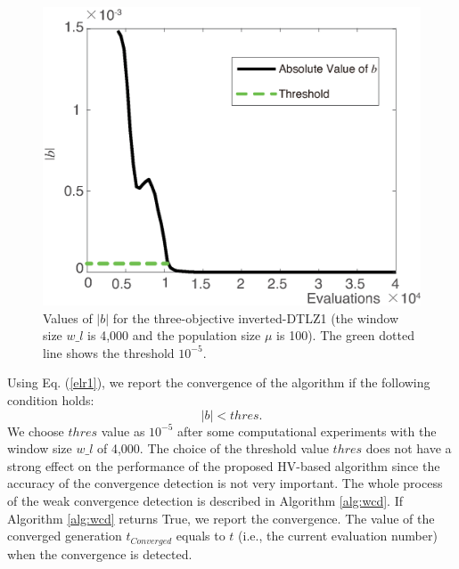 \documentclass[conference]{IEEEtran}
\begin{document}
\begin{figure}[!t]
  \centering
    \includegraphics[width=\columnwidth]{FVEMOA_IDTLZ1_M3_nadir_2}
  \caption{Values of $\lvert b\rvert$ for the three-objective inverted-DTLZ1
  (the window size $w\_l$ is 4,000 and the population size $\mu$ is 100).
  The green dotted line shows the threshold $10^{-5}$. 
  }
  \label{wcd2}
\end{figure}

Using Eq. (\ref{elr1}), we report the convergence of the algorithm if the following
condition holds:
\begin{equation}\label{elr2}
  \lvert b \rvert < thres. 
\end{equation}
We choose $thres$ value as $10^{-5}$ after some computational experiments with 
the window size $w\_ l$ of 4,000. 
The choice of the threshold value $thres$ does not have a strong effect on the performance 
of the proposed HV-based algorithm since the accuracy of the convergence detection is not very important.
The whole process of the weak convergence detection is described in Algorithm \ref{alg:wcd}. 
If Algorithm \ref{alg:wcd} returns True, we report the convergence. 
The value of the converged generation $t_{Converged}$ equals to $t$ (i.e., the current evaluation number) 
when the convergence is detected. 
\end{document}
